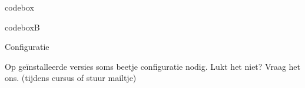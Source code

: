 

\begin{saveblock}{codebox}
	\begin{highlightblock}
		\usepackage[backend=biber]{biblatex}
	\end{highlightblock}
\end{saveblock}

\begin{saveblock}{codeboxB}
	\begin{highlightblock}
	\end{highlightblock}
\end{saveblock}

\begin{frame}{Configuratie}

	\bigskip

	Op ge\"installeerde versies soms beetje configuratie nodig.
	Lukt het niet? Vraag het ons. (tijdens cursus of stuur mailtje)
	

\end{frame}

	



	
		
			
